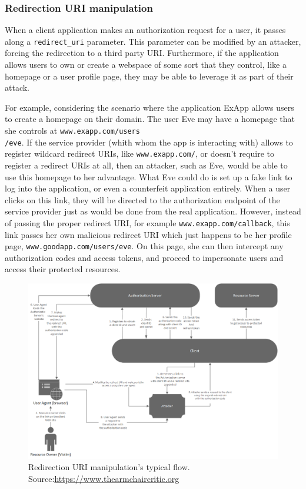 \subsubsection{Redirection URI manipulation}
When a client application makes an authorization request for a user, it passes along a \texttt{redirect\_uri} parameter. This parameter can be modified by an attacker, forcing the redirection to a third party URI.
Furthermore, if the application allows users to own or create a webspace of some sort that they control, like a homepage or a user profile page, they may be able to leverage it as part of their attack.

For example, considering the scenario where the application ExApp allows users to create a homepage on their domain. The user Eve may have a homepage that she controls at \texttt{www.exapp.com/users \\ /eve}. If the service provider (whith whom the app is interacting with) allows to register wildcard redirect URIs, like \texttt{www.exapp.com/\*}, or doesn't require to register a redirect URIs at all, then an attacker, such as Eve, would be able to use this homepage to her advantage.
What Eve could do is set up a fake link to log into the application, or even a counterfeit application entirely. When a user clicks on this link, they will be directed to the authorization endpoint of the service provider just as would be done from the real application. However, instead of passing the proper redirect URI, for example \texttt{www.exapp.com/callback}, this link passes her own malicious redirect URI which just happens to be her profile page, \texttt{www.goodapp.com/users/eve}. On this page, she can then intercept any authorization codes and access tokens, and proceed to impersonate users and access their protected resources.


\begin{figure}[ht]
    \centering
    \includegraphics[scale=0.65]{chapters/images/chp4/authCodeURIAttack.png}
    \caption[caption]{Redirection URI manipulation's typical flow.\\Source:\hspace{0.2cm}\url{https://www.thearmchaircritic.org}}
    \label{fig:reduri}
\end{figure}

